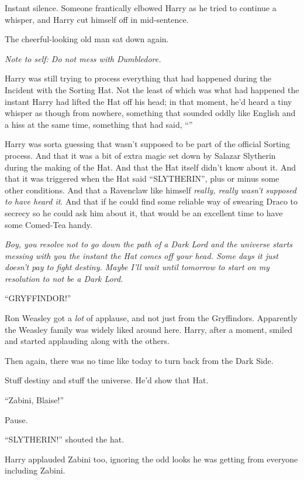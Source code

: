 Instant silence. Someone frantically elbowed Harry as he tried to continue a whisper, and Harry cut himself off in mid-sentence.

The cheerful-looking old man sat down again.

\emph{Note to self: Do not mess with Dumbledore.}

Harry was still trying to process everything that had happened during the Incident with the Sorting Hat. Not the least of which was what had happened the instant Harry had lifted the Hat off his head; in that moment, he’d heard a tiny whisper as though from nowhere, something that sounded oddly like English and a hiss at the same time, something that had said, “”

Harry was sorta guessing that wasn’t supposed to be part of the official Sorting process. And that it was a bit of extra magic set down by Salazar Slytherin during the making of the Hat. And that the Hat itself didn’t know about it. And that it was triggered when the Hat said “SLYTHERIN”, plus or minus some other conditions. And that a Ravenclaw like himself \emph{really, really wasn’t supposed to have heard it}. And that if he could find some reliable way of swearing Draco to secrecy so he could ask him about it, that would be an excellent time to have some Comed-Tea handy.

\emph{Boy, you resolve not to go down the path of a Dark Lord and the universe starts messing with you the instant the Hat comes off your head. Some days it just doesn’t pay to fight destiny. Maybe I’ll wait until tomorrow to start on my resolution to not be a Dark Lord.}

“GRYFFINDOR!”

Ron Weasley got a \emph{lot} of applause, and not just from the Gryffindors. Apparently the Weasley family was widely liked around here. Harry, after a moment, smiled and started applauding along with the others.

Then again, there was no time like today to turn back from the Dark Side.

Stuff destiny and stuff the universe. He’d show that Hat.

“Zabini, Blaise!”

Pause.

“SLYTHERIN!” shouted the hat.

Harry applauded Zabini too, ignoring the odd looks he was getting from everyone including Zabini.

